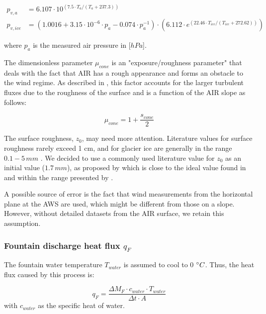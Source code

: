 \documentclass[utf8]{frontiersSCNS} %
\begin{document}
\begin{equation} \begin{split} p_{v,a}&=6.107 \cdot 10^{(7.5 \cdot T_a / (T_a + 237.3))}\\ p_{v,ice}&=(1.0016 +
		3.15\cdot10^{-6}\cdot p_{a}-0.074\cdot p_{a}^{-1})\cdot(6.112 \cdot e^{(22.46 \cdot T_{ice} / (T_{ice} + 272.62))})
	\end{split} \label{eqn:vp} \end{equation}

where $p_{a}$ is the measured air pressure in [$hPa$].

The dimensionless parameter $\mu_{cone}$ is an "exposure/roughness parameter" that deals with the fact that AIR has a
rough appearance and forms an obstacle to the wind regime. As described in \cite{Oerlemans_2021}, this factor accounts
for the larger turbulent fluxes due to the roughness of the surface and is a function of the AIR slope as follows:

\begin{equation}
	\mu_{cone} = 1 + \frac{s_{cone}}{2}
\end{equation}

The surface roughness, $z_{0}$, may need more attention. Literature values for surface roughness rarely exceed 1 cm, and
for glacier ice are generally in the range $0.1-5\, mm$ \citet{BrockWillisSharp_2006}. We decided to use a commonly used
literature value for $z_{0}$ as an initial value ($1.7\,mm$), as proposed by \cite{CuffeyPaterson_2010} which is close to
the ideal value found in \cite{reid_brock_2014} and within the range presented by \cite{BrockWillisSharp_2006}.

A possible source of error is the fact that wind measurements from the horizontal plane at the AWS are used, which might
be different from those on a slope. However, without detailed datasets from the AIR surface, we retain this
assumption.

\subsubsection{Fountain discharge heat flux \texorpdfstring{$q_{F}$}{Lg} }
The fountain water temperature $T_{water}$ is assumed to cool to 0 $\degree C$. Thus, the heat flux caused by this
process is:

\begin{equation}
	q_{F} = \frac{ \Delta M_F \cdot c_{water} \cdot T_{water}}{\Delta t \cdot A}
	\label{eqn:qF}
\end{equation}
with $c_{water}$ as the specific heat of water.
\end{document}
